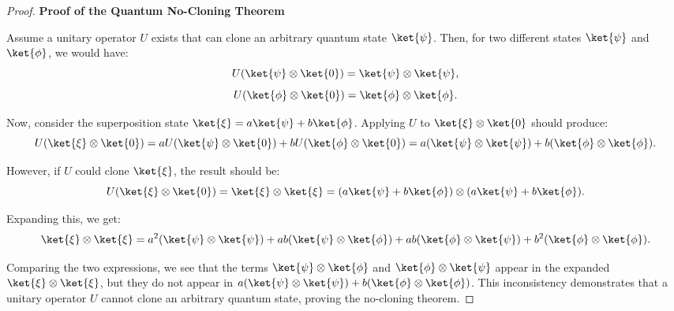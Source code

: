 

\begin{proof}
  \textbf{Proof of the Quantum No-Cloning Theorem}

  Assume a unitary operator $U$ exists that can clone an arbitrary quantum
  state $\ket{\psi}$. Then, for two different states $\ket{\psi}$ and
  $\ket{\phi}$, we would have:
  \[
    U(\ket{\psi} \otimes \ket{0}) = \ket{\psi} \otimes \ket{\psi},
  \]
  \[
    U(\ket{\phi} \otimes \ket{0}) = \ket{\phi} \otimes \ket{\phi}.
  \]

  Now, consider the superposition state $\ket{\xi} = a\ket{\psi} +
  b\ket{\phi}$. Applying $U$ to $\ket{\xi} \otimes \ket{0}$ should produce:
  \[
    U(\ket{\xi} \otimes \ket{0}) = aU(\ket{\psi} \otimes \ket{0}) +
    bU(\ket{\phi} \otimes \ket{0}) = a(\ket{\psi} \otimes \ket{\psi}) +
    b(\ket{\phi} \otimes \ket{\phi}).
  \]

  However, if $U$ could clone $\ket{\xi}$, the result should be:
  \[
    U(\ket{\xi} \otimes \ket{0}) = \ket{\xi} \otimes \ket{\xi} = (a\ket{\psi}
    + b\ket{\phi}) \otimes (a\ket{\psi} + b\ket{\phi}).
  \]

  Expanding this, we get:
  \[
    \ket{\xi} \otimes \ket{\xi} = a^2(\ket{\psi} \otimes \ket{\psi}) +
    ab(\ket{\psi} \otimes \ket{\phi}) + ab(\ket{\phi} \otimes \ket{\psi}) +
    b^2(\ket{\phi} \otimes \ket{\phi}).
  \]

  Comparing the two expressions, we see that the terms $\ket{\psi} \otimes
  \ket{\phi}$ and $\ket{\phi} \otimes \ket{\psi}$ appear in the expanded
  $\ket{\xi} \otimes \ket{\xi}$, but they do not appear in $a(\ket{\psi}
  \otimes \ket{\psi}) + b(\ket{\phi} \otimes \ket{\phi})$. This inconsistency
  demonstrates that a unitary operator $U$ cannot clone an arbitrary quantum
  state, proving the no-cloning theorem.
\end{proof}



